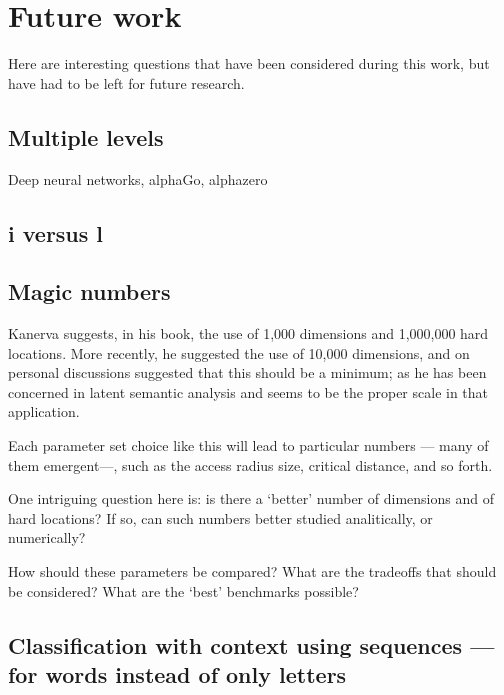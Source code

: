 \section{Future work}

Here are interesting questions that have been considered during this work, but have had to be left for future research.

\subsection{Multiple levels}

Deep neural networks, alphaGo, alphazero



\subsection{i versus l}


\subsection{Magic numbers}

Kanerva suggests, in his book, the use of 1,000 dimensions and 1,000,000 hard locations.  More recently, he suggested the use of 10,000 dimensions, and on personal discussions suggested that this should be a minimum; as he has been concerned in latent semantic analysis and seems to be the proper scale in that application.

Each parameter set choice like this will lead to particular numbers --- many of them emergent---, such as the access radius size, critical distance, and so forth.

One intriguing question here is:  is there a `better' number of dimensions and of hard locations?  If so, can such numbers better studied analitically, or numerically?

How should these parameters be compared?  What are the tradeoffs that should be considered?  What are the `best' benchmarks possible?

\subsection{Classification with context using sequences --- for words instead of only letters}










